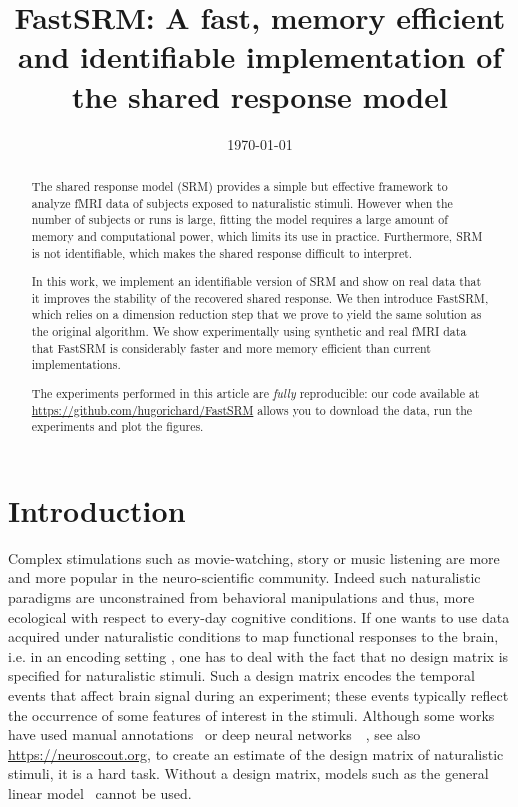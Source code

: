 \documentclass{article}
\title{FastSRM: A fast, memory efficient and identifiable implementation of the
  shared response model}
\date{\today} %
\newcommand{\bt}[1]{\todo[color=orange, inline=True]{BT: #1}}
\begin{document}
\maketitle

\begin{abstract}
  The shared response model (SRM) provides a simple but effective framework to analyze
  fMRI data of subjects exposed to naturalistic stimuli.
  However when the number
  of subjects or runs is large,
  fitting the model requires a large amount of memory
and computational power, which limits its use in practice.
%
Furthermore, SRM is
not identifiable, which makes the shared response difficult to interpret.


In this work, we implement an identifiable version of SRM and show on real data
that it improves the stability of the recovered shared response.
%
We then introduce FastSRM, which relies on a dimension reduction step that we
prove to yield the same solution as the original algorithm.
%
We show experimentally using synthetic and real fMRI data
that FastSRM is considerably faster and more memory efficient
than current implementations.


The experiments performed in this article are \emph{fully} reproducible: our
code available at \url{https://github.com/hugorichard/FastSRM} allows you to download the
data, run the experiments and plot the figures.
%

\end{abstract}

\section{Introduction}
%
Complex stimulations such as movie-watching, story or music listening are more
and more popular in the neuro-scientific community. Indeed such naturalistic
paradigms are unconstrained from behavioral manipulations and thus, more
ecological with respect to every-day cognitive conditions.
%
If one wants to use data acquired under naturalistic conditions to map
functional responses to the brain, i.e. in an encoding setting
\cite{naselaris2011}, one has to deal with the fact that no design matrix is
specified for naturalistic stimuli.
%
Such a design matrix encodes the temporal events that affect brain
signal during an experiment; these events typically reflect the occurrence
of some features of interest in the stimuli.
%
Although some works have used manual
annotations~\cite{huth2012continuous} or deep neural
networks~\cite{gucclu2017increasingly}~\cite{richard2018optimizing},
see also \url{https://neuroscout.org}, to create an estimate of the
design matrix of naturalistic stimuli, it is a hard task.
%
Without a design matrix, models such as the general linear
model~\cite{poline2012general} cannot be used.
\end{document}

